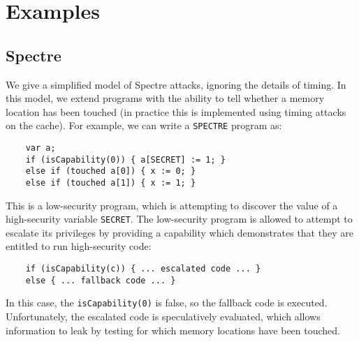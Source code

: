 \section{Examples}

\subsection{Spectre}

We give a simplified model of Spectre attacks, ignoring the details of
timing.  In this model, we extend programs with the ability to tell
whether a memory location has been touched (in practice this is
implemented using timing attacks on the cache). For example,
we can write a \verb|SPECTRE| program as:
\begin{verbatim}
    var a;
    if (isCapability(0)) { a[SECRET] := 1; }
    else if (touched a[0]) { x := 0; }
    else if (touched a[1]) { x := 1; }
\end{verbatim}
This is a low-security program, which is attempting to discover the
value of a high-security variable \verb|SECRET|. The low-security program
is allowed to attempt to escalate its privileges by providing a capability
which demonstrates that they are entitled to run high-security code:
\begin{verbatim}
    if (isCapability(c)) { ... escalated code ... }
    else { ... fallback code ... }
\end{verbatim}
In this case, the \verb|isCapability(0)| is false, so the fallback code
is executed. Unfortunately, the escalated code is speculatively
evaluated, which allows information to leak by testing for which
memory locations have been touched.

